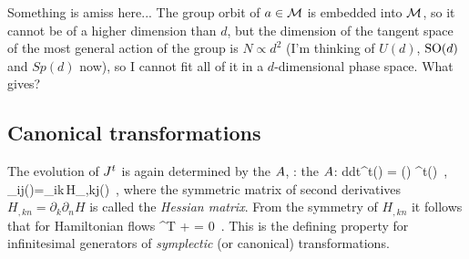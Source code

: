 {Something is amiss here... The group orbit of $a \in {\cal M}$ is embedded
into ${\cal M}$, so it cannot be of a higher dimension than $d$, but the dimension of
the tangent space of the most general
action of the group is $N \propto d^2$ (I'm thinking of $U(d)$, $\textrm{SO}(d)$ and
$Sp(d)$ now), so I cannot fit all of it in a $d$-dimensional phase space.
What gives?
    } %


\subsection{Canonical transformations}
\label{sect:CanonTransf}

The
evolution of $J^t$
    \ifdasbuch
{}
    \else
    \fi
is again determined by
    \ifdasbuch
the {\stabmat} $A$, :
    \else
the {\stabmat} $A$:
    \fi
\beq
{d\over dt}\jMps^t(\pSpace) = \Mvar(\pSpace)
\jMps^t(\pSpace)
\,, \qquad
\Mvar_{ij}(\pSpace)={\omega}_{ik}\,H_{,kj}(\pSpace)
\,,
where the symmetric matrix of second derivatives
$H_{,kn} = \partial_k \partial_n H$
is called the {\em Hessian matrix}.
From
the symmetry of $H_{,kn}$
it follows that for Hamiltonian flows 
\beq
 \Mvar^T {\bf \omega} + {\bf \omega} \Mvar = 0
\,.
This is the defining property  for infinitesimal
generators of {\em symplectic} (or canonical) transformations.

